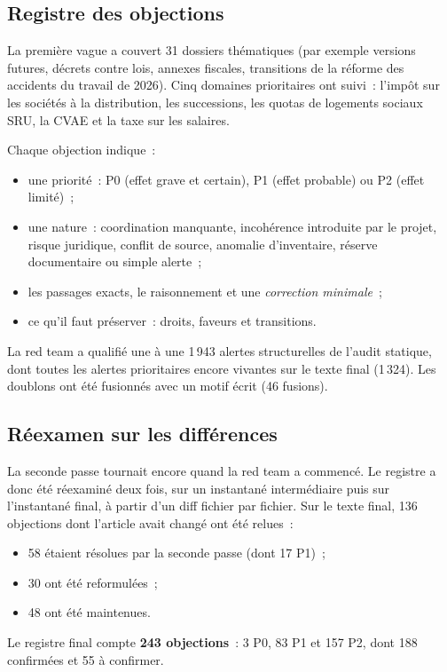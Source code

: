 \documentclass[11pt,a4paper]{article}
\begin{document}
\subsection{Registre des objections}

La première vague a couvert 31 dossiers thématiques (par exemple versions futures, décrets contre lois, annexes fiscales, transitions de la réforme des accidents du travail de 2026). Cinq domaines prioritaires ont suivi~: l'impôt sur les sociétés à la distribution, les successions, les quotas de logements sociaux SRU, la CVAE et la taxe sur les salaires.

Chaque objection indique~:
\begin{itemize}
  \item une priorité~: P0 (effet grave et certain), P1 (effet probable) ou P2 (effet limité)~;
  \item une nature~: coordination manquante, incohérence introduite par le projet, risque juridique, conflit de source, anomalie d'inventaire, réserve documentaire ou simple alerte~;
  \item les passages exacts, le raisonnement et une \emph{correction minimale}~;
  \item ce qu'il faut préserver~: droits, faveurs et transitions.
\end{itemize}
La red team a qualifié une à une 1\,943 alertes structurelles de l'audit statique, dont toutes les alertes prioritaires encore vivantes sur le texte final (1\,324). Les doublons ont été fusionnés avec un motif écrit (46 fusions).

\subsection{Réexamen sur les différences}

La seconde passe tournait encore quand la red team a commencé. Le registre a donc été réexaminé deux fois, sur un instantané intermédiaire puis sur l'instantané final, à partir d'un diff fichier par fichier. Sur le texte final, 136 objections dont l'article avait changé ont été relues~:
\begin{itemize}
  \item 58 étaient résolues par la seconde passe (dont 17 P1)~;
  \item 30 ont été reformulées~;
  \item 48 ont été maintenues.
\end{itemize}
Le registre final compte \textbf{243 objections}~: 3 P0, 83 P1 et 157 P2, dont 188 confirmées et 55 à confirmer.
\end{document}

